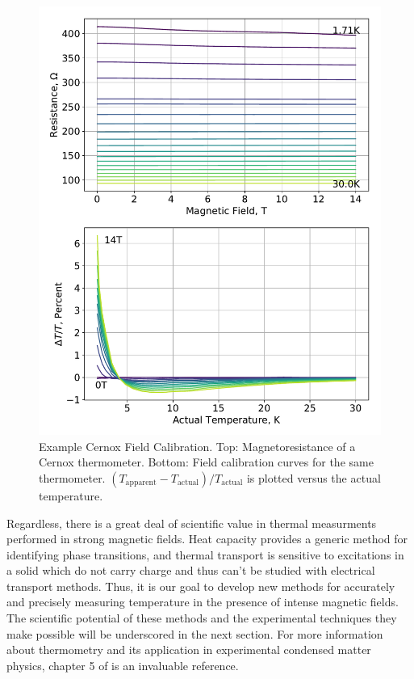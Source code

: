 \documentclass{thesis-umich}
\begin{document}
\begin{figure}
\centering
\includegraphics[width=\textwidth]{figures/cal_cernox_1.pdf}
\caption{Example Cernox Field Calibration. Top: Magnetoresistance of a
Cernox thermometer. Bottom: Field calibration curves for the same
thermometer.
\((T_{\mathrm{apparent}} - T_{\mathrm{actual}})/T_{\mathrm{actual}}\) is
plotted versus the actual temperature. \label{cernox_fieldcal}}
\end{figure}

Regardless, there is a great deal of scientific value in thermal
measurments performed in strong magnetic fields. Heat capacity provides
a generic method for identifying phase transitions, and thermal
transport is sensitive to excitations in a solid which do not carry
charge and thus can't be studied with electrical transport methods.
Thus, it is our goal to develop new methods for accurately and precisely
measuring temperature in the presence of intense magnetic fields. The
scientific potential of these methods and the experimental techniques
they make possible will be underscored in the next section. For more
information about thermometry and its application in experimental
condensed matter physics, chapter 5 of \cite{Ekin2006} is an invaluable
reference.
\end{document}
